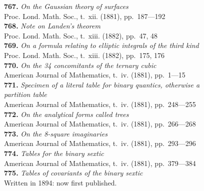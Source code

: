 \documentclass[12pt,a4paper,oneside]{book}
\begin{document}
\small
\noindent\textbf{767.} \textit{On the Gaussian theory of surfaces} \\
\hspace*{2em}Proc. Lond. Math. Soc., t.~xii. (1881), pp.~187---192\\[0.4em]
\textbf{768.} \textit{Note on Landen's theorem} \\
\hspace*{2em}Proc. Lond. Math. Soc., t.~xiii. (1882), pp.~47, 48\\[0.4em]
\textbf{769.} \textit{On a formula relating to elliptic integrals of the third kind} \\
\hspace*{2em}Proc. Lond. Math. Soc., t.~xiii. (1882), pp.~175, 176\\[0.4em]
\textbf{770.} \textit{On the 34 concomitants of the ternary cubic} \\
\hspace*{2em}American Journal of Mathematics, t.~iv. (1881), pp.~1---15\\[0.4em]
\textbf{771.} \textit{Specimen of a literal table for binary quantics, otherwise a}\\
\hspace*{2em}\textit{partition table} \\
\hspace*{2em}American Journal of Mathematics, t.~iv. (1881), pp.~248---255\\[0.4em]
\textbf{772.} \textit{On the analytical forms called trees} \\
\hspace*{2em}American Journal of Mathematics, t.~iv. (1881), pp.~266---268\\[0.4em]
\textbf{773.} \textit{On the 8-square imaginaries} \\
\hspace*{2em}American Journal of Mathematics, t.~iv. (1881), pp.~293---296\\[0.4em]
\textbf{774.} \textit{Tables for the binary sextic} \\
\hspace*{2em}American Journal of Mathematics, t.~iv. (1881), pp.~379---384\\[0.4em]
\textbf{775.} \textit{Tables of covariants of the binary sextic} \\
\hspace*{2em}Written in 1894: now first published.\\[0.4em]
\end{document}
